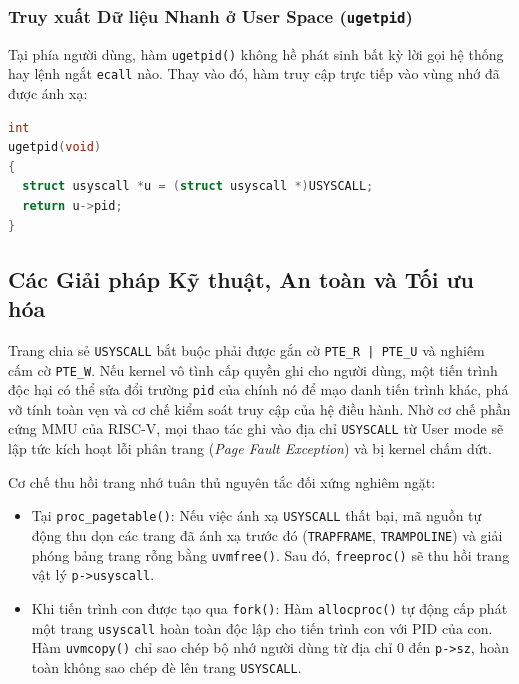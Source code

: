 \subsubsection{Truy xuất Dữ liệu Nhanh ở User Space (\texttt{ugetpid})}
Tại phía người dùng, hàm \texttt{ugetpid()} không hề phát sinh bất kỳ lời gọi hệ thống hay lệnh ngắt \texttt{ecall} nào. Thay vào đó, hàm truy cập trực tiếp vào vùng nhớ đã được ánh xạ:

\begin{lstlisting}[language=C, caption={Cài đặt hàm ugetpid() trong user/ulib.c}]
int
ugetpid(void)
{
  struct usyscall *u = (struct usyscall *)USYSCALL;
  return u->pid;
}
\end{lstlisting}

\subsection{Các Giải pháp Kỹ thuật, An toàn và Tối ưu hóa}

\begin{calloutwarning}
    Trang chia sẻ \texttt{USYSCALL} bắt buộc phải được gắn cờ \texttt{PTE\_R | PTE\_U} và nghiêm cấm cờ \texttt{PTE\_W}. Nếu kernel vô tình cấp quyền ghi cho người dùng, một tiến trình độc hại có thể sửa đổi trường \texttt{pid} của chính nó để mạo danh tiến trình khác, phá vỡ tính toàn vẹn và cơ chế kiểm soát truy cập của hệ điều hành. Nhờ cơ chế phần cứng MMU của RISC-V, mọi thao tác ghi vào địa chỉ \texttt{USYSCALL} từ User mode sẽ lập tức kích hoạt lỗi phân trang (\textit{Page Fault Exception}) và bị kernel chấm dứt.
\end{calloutwarning}

\begin{callouttip}
    Cơ chế thu hồi trang nhớ tuân thủ nguyên tắc đối xứng nghiêm ngặt:
    \begin{itemize}
        \item Tại \texttt{proc\_pagetable()}: Nếu việc ánh xạ \texttt{USYSCALL} thất bại, mã nguồn tự động thu dọn các trang đã ánh xạ trước đó (\texttt{TRAPFRAME}, \texttt{TRAMPOLINE}) và giải phóng bảng trang rỗng bằng \texttt{uvmfree()}. Sau đó, \texttt{freeproc()} sẽ thu hồi trang vật lý \texttt{p->usyscall}.
        \item Khi tiến trình con được tạo qua \texttt{fork()}: Hàm \texttt{allocproc()} tự động cấp phát một trang \texttt{usyscall} hoàn toàn độc lập cho tiến trình con với PID của con. Hàm \texttt{uvmcopy()} chỉ sao chép bộ nhớ người dùng từ địa chỉ 0 đến \texttt{p->sz}, hoàn toàn không sao chép đè lên trang \texttt{USYSCALL}.
    \end{itemize}
\end{callouttip}

